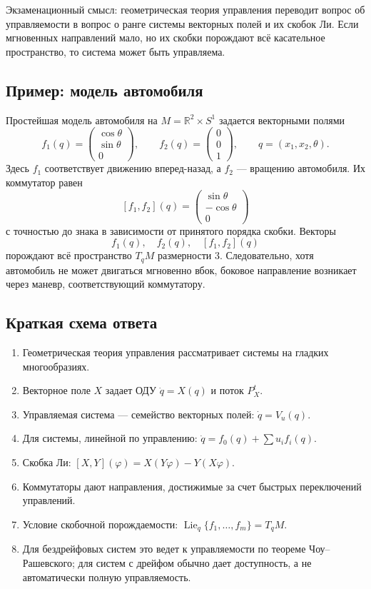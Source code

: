 \documentclass[12pt,a4paper]{article}
\newcommand{\Lie}{\operatorname{Lie}}
\begin{document}
Экзаменационный смысл: геометрическая теория управления переводит вопрос об управляемости в вопрос о ранге системы векторных полей и их скобок Ли. Если мгновенных направлений мало, но их скобки порождают всё касательное пространство, то система может быть управляема.

\subsection*{Пример: модель автомобиля}
Простейшая модель автомобиля на $M=\mathbb R^2\times S^1$ задается векторными полями
\[
f_1(q)=
\begin{pmatrix}
\cos\theta\\
\sin\theta\\
0
\end{pmatrix},
\qquad
f_2(q)=
\begin{pmatrix}
0\\
0\\
1
\end{pmatrix},
\qquad q=(x_1,x_2,\theta).
\]
Здесь $f_1$ соответствует движению вперед-назад, а $f_2$ --- вращению автомобиля. Их коммутатор равен
\[
[f_1,f_2](q)=
\begin{pmatrix}
\sin\theta\\
-\cos\theta\\
0
\end{pmatrix}
\]
с точностью до знака в зависимости от принятого порядка скобки. Векторы
\[
f_1(q),\quad f_2(q),\quad [f_1,f_2](q)
\]
порождают всё пространство $T_qM$ размерности 3. Следовательно, хотя автомобиль не может двигаться мгновенно вбок, боковое направление возникает через маневр, соответствующий коммутатору.

\subsection*{Краткая схема ответа}
\begin{enumerate}
    \item Геометрическая теория управления рассматривает системы на гладких многообразиях.
    \item Векторное поле $X$ задает ОДУ $\dot q=X(q)$ и поток $P_X^t$.
    \item Управляемая система --- семейство векторных полей: $\dot q=V_u(q)$.
    \item Для системы, линейной по управлению: $\dot q=f_0(q)+\sum u_i f_i(q)$.
    \item Скобка Ли: $[X,Y](\varphi)=X(Y\varphi)-Y(X\varphi)$.
    \item Коммутаторы дают направления, достижимые за счет быстрых переключений управлений.
    \item Условие скобочной порождаемости: $\Lie_q\{f_1,\ldots,f_m\}=T_qM$.
    \item Для бездрейфовых систем это ведет к управляемости по теореме Чоу--Рашевского; для систем с дрейфом обычно дает доступность, а не автоматически полную управляемость.
\end{enumerate}
\end{document}
